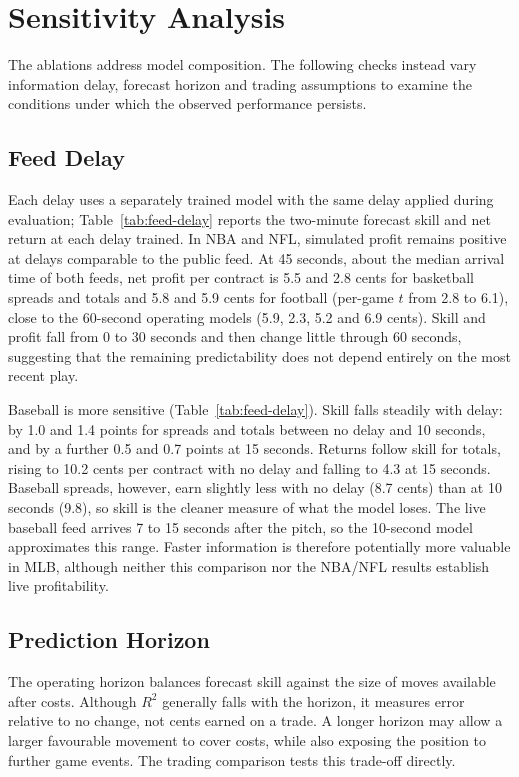 \documentclass[12pt,a4paper,oneside]{report}
\begin{document}
\section{Sensitivity Analysis}\label{sec:exp-sensitivity}
The ablations address model composition. The following checks instead vary
information delay, forecast horizon and trading assumptions to examine the
conditions under which the observed performance persists.

\subsection{Feed Delay}
Each delay uses a separately trained model with the same delay applied during
evaluation; Table~\ref{tab:feed-delay} reports the two-minute forecast skill and net
return at each delay trained. In NBA and NFL, simulated profit remains positive at delays
comparable to the public feed. At 45 seconds, about the median arrival time of
both feeds, net profit per contract is 5.5 and 2.8 cents for basketball spreads and
totals and 5.8 and 5.9 cents for football (per-game $t$ from 2.8 to 6.1), close to
the 60-second operating models (5.9, 2.3, 5.2 and 6.9 cents). Skill and profit fall
from 0 to 30 seconds and then change little through 60 seconds, suggesting that the
remaining predictability does not depend entirely on the most recent play.



Baseball is more sensitive (Table~\ref{tab:feed-delay}). Skill falls steadily with
delay: by 1.0 and 1.4 points for spreads and totals between no delay and 10 seconds,
and by a further 0.5 and 0.7 points at 15 seconds. Returns follow skill for totals,
rising to 10.2 cents per contract with no delay and falling to 4.3 at 15 seconds.
Baseball spreads, however, earn slightly less with no delay (8.7 cents) than at
10 seconds (9.8), so skill is the cleaner measure of what the model loses. The live baseball feed arrives 7 to 15 seconds after the pitch, so the
10-second model approximates this range. Faster information is therefore
potentially more valuable in MLB, although neither this comparison nor the
NBA/NFL results establish live profitability.

\subsection{Prediction Horizon}\label{sec:horizon-choice}
The operating horizon balances forecast skill against the size of moves
available after costs. Although $R^2$ generally falls with the horizon, it
measures error relative to no change, not cents earned on a trade. A longer
horizon may allow a larger favourable movement to cover costs, while also
exposing the position to further game events. The trading comparison tests
this trade-off directly.
\end{document}
